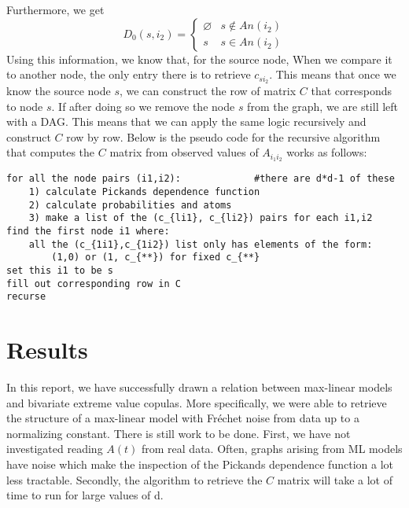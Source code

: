 \documentclass[12pt]{article}
\def\f{Fréchet }
\theoremstyle{definition}
\theoremstyle{definition}
\begin{document}
Furthermore, we get 
$$D_0(s,i_2)=\begin{cases}\varnothing & s\notin An(i_2)\\
    s & s\in An(i_2)
    \end{cases}$$
Using this information, we know that, for the source node, When we compare it to another node, the only entry there is to retrieve $c_{si_2}$. This means that once we know the source node $s$, we can construct the row of matrix $C$ that corresponds to node $s$. If after doing so we remove the node $s$ from the graph, we are still left with a DAG. This means that we can apply the same logic recursively and construct $C$ row by row.  Below is the pseudo code for the recursive algorithm that computes the $C$ matrix from observed values of $A_{i_1i_2}$ works as follows:
\begin{lstlisting}
for all the node pairs (i1,i2):             #there are d*d-1 of these 
    1) calculate Pickands dependence function
    2) calculate probabilities and atoms
    3) make a list of the (c_{li1}, c_{li2}) pairs for each i1,i2
find the first node i1 where:
    all the (c_{1i1},c_{1i2}) list only has elements of the form:
        (1,0) or (1, c_{**}) for fixed c_{**} 
set this i1 to be s
fill out corresponding row in C 
recurse
\end{lstlisting}

\section{Results}
In this report, we have successfully drawn a relation between max-linear models and bivariate extreme value copulas. More specifically, we were able to retrieve the structure of a max-linear model with \f noise from data up to a normalizing constant. There is still work to be done. First, we have not investigated reading $A(t)$ from real data. Often, graphs arising from ML models have noise which make the inspection of the Pickands dependence function a lot less tractable. Secondly, the algorithm to retrieve the $C$ matrix will take a lot of time to run for large values of d.




\end{document}
